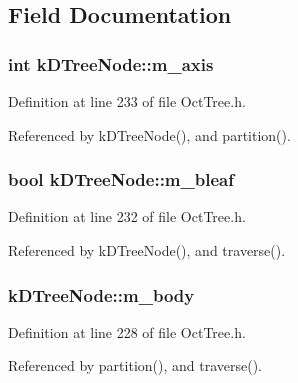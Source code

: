 \subsection{Field Documentation}
\subsubsection[{m\_\-axis}]{\setlength{\rightskip}{0pt plus 5cm}int {\bf kDTreeNode::m\_\-axis}}\label{classkDTreeNode_af322d17aef0eabe2e151bf23f8aba132}


Definition at line 233 of file OctTree.h.



Referenced by kDTreeNode(), and partition().

\subsubsection[{m\_\-bleaf}]{\setlength{\rightskip}{0pt plus 5cm}bool {\bf kDTreeNode::m\_\-bleaf}}\label{classkDTreeNode_a2ce766b2fc937514794f97c1eceb8f01}


Definition at line 232 of file OctTree.h.



Referenced by kDTreeNode(), and traverse().

\subsubsection[{m\_\-body}]{ {\bf kDTreeNode::m\_\-body}}\label{classkDTreeNode_a61e1abf39597793e6fdb10504220f364}


Definition at line 228 of file OctTree.h.



Referenced by partition(), and traverse().

